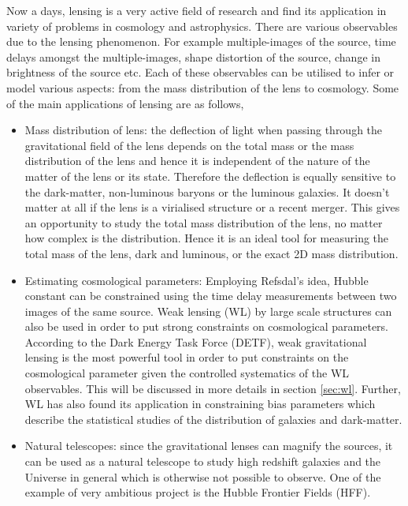 Now a days, lensing is a very active field of research and find its application
in variety of problems in cosmology and astrophysics. 
There are various observables due to the lensing phenomenon. For example 
multiple-images of the source, time 
delays amongst the multiple-images, shape distortion of the source, change in brightness
of the source etc. Each of these observables can be utilised to infer or model various
aspects: from the mass distribution of the lens to cosmology. 
Some of the main applications of lensing are as follows,
\begin{itemize}
	\item Mass distribution of lens: the deflection of light when passing through
			the gravitational field of the lens depends on the total mass or the
			mass distribution of the lens and hence it is independent of the nature
			of the matter of the lens or its state. Therefore the
			deflection is equally sensitive to the dark-matter, non-luminous baryons
			or the luminous galaxies. It doesn't matter at all if the lens is a 
			virialised structure or a recent merger. This gives an opportunity to 
			study the total mass distribution of the lens, no matter how complex is 
			the distribution. Hence it is an ideal tool for measuring the total mass
			of the lens, dark and luminous, or the exact 2D mass distribution. 

	\item Estimating cosmological parameters: Employing Refsdal's idea, Hubble constant
			can be constrained using the time delay measurements between two images
			of the same source. Weak lensing (WL) by large scale structures 
			can also be used in order to put
			strong constraints on cosmological parameters. According to the Dark 
			Energy Task Force (DETF), weak gravitational lensing is the most powerful
			tool in order to put constraints on the cosmological parameter given
			the controlled systematics of the WL observables. This will be discussed
			in more details in section \ref{sec:wl}. Further, WL has also found its application
			in constraining bias parameters which describe the statistical studies
			of the distribution of galaxies and dark-matter. 

	\item Natural telescopes: since the gravitational lenses can magnify the sources, it 
			can be used as a natural telescope to study high redshift galaxies and the Universe
			in general which is otherwise not possible to observe. One of the example of 
			very ambitious project is the Hubble Frontier Fields (HFF). 
\end{itemize}


